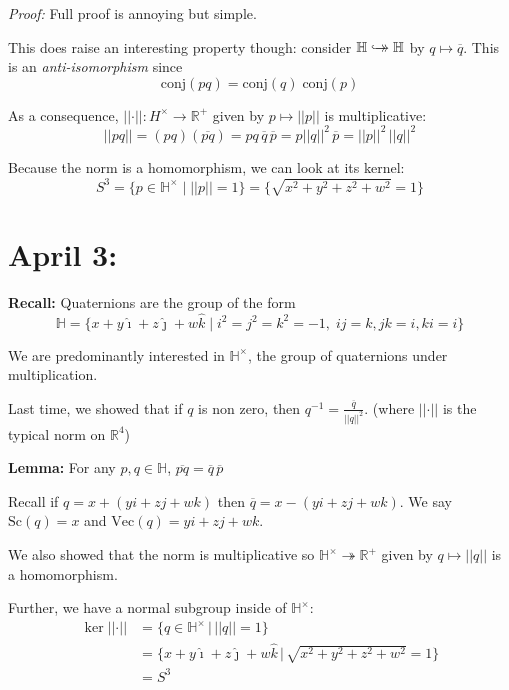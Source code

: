 \documentclass[12pt]{article}
\renewcommand{\hat}[1]{\widehat{#1}}
\newcommand{\R}{\mathbb{R}}
\renewcommand{\H}{\mathbb{H}}
\newcommand{\norm}[1]{\left\vert \left\vert #1 \right\vert \right\vert}
\newcommand{\biject}{\hookrightarrow \hspace{-8pt} \rightarrow}
\newcommand{\ihat}{\hat{\imath}}
\newcommand{\jhat}{\hat{\jmath}}
\newcommand{\khat}{\hat{k}}
\renewcommand{\bar}{\overline}
\newenvironment*{tbox}[2][gray]{
    \begin{tcolorbox}[
        parbox=false,
        colback=#1!5!white,
        colframe=#1!75!black,
        breakable,
        title={#2}
    ]}
    {\end{tcolorbox}}
\begin{document}
    \begin{tbox}{\textbf{Claim:} $\bar{pq} = \bar{q} \, \bar{p}$}
        \emph{Proof:} Full proof is annoying but simple. 
    \end{tbox}

    This does raise an interesting property though: consider $\H \biject \H$ by $q \mapsto \bar q$. This is an \emph{anti-isomorphism} since 
    \[\text{conj}(pq) = \text{conj}(q)\; \text{conj}(p)\]

    As a consequence, $\norm{\cdot}: H^{\times} \to \R^+$ given by $p \mapsto \norm{p}$ is multiplicative: 
    \[\norm{pq} = (pq)(\bar{pq}) = pq\, \bar q\, \bar p = p \norm{q}^2\, \bar p = \norm{p}^2 \, \norm{q}^2\]

    Because the norm is a homomorphism, we can look at its kernel: 
    \[S^3 = \{p \in \H^{\times} \; | \; \norm{p} = 1\} = \{\sqrt{x^2 + y^2 +z^2 + w^2}  =1\}\]

\section{April 3:} 
    \textbf{Recall:} Quaternions are the group of the form 
    \[\H = \{x + y\ihat + z\jhat + w\khat \; | \; i^2 = j^2 = k^2 = -1, \; ij = k, jk =i, ki = i\}\]

    We are predominantly interested in $\H^{\times}$, the group of quaternions under multiplication. 

    Last time, we showed that if $q$ is non zero, then $q^{-1} = \frac{\bar q}{\norm{q}^2}$. (where $\norm{\cdot}$ is the typical norm on $\R^4$)
 
    \textbf{Lemma:} For any $p, q \in \H$, $\bar{pq} = \bar q\, \bar p$ 

    Recall if $q = x + (yi + zj + wk)$ then $\bar q = x - (yi + zj + wk)$. We say $\text{Sc}(q) = x$ and $\text{Vec}(q) = yi + zj + wk$.

    We also showed that the norm is multiplicative so $\H^{\times} \twoheadrightarrow \R^+$ given by $q \mapsto \norm{q}$ is a homomorphism. 

    Further, we have a normal subgroup inside of $\H^{\times}$: 
    \begin{align*}
        \ker \norm \cdot &= \{q \in \H^{\times} \, | \, \norm{q} = 1\}\\ 
            &= \{x + y\ihat + z\jhat + w\khat \, | \, \sqrt{x^2 + y^2 + z^2 + w^2} = 1\}\\ 
            &= S^3
    \end{align*}
\end{document}

